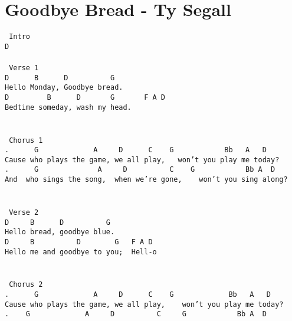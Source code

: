 \newpage
\section{Goodbye Bread - Ty Segall}
\label{Goodbye Bread - Ty Segall}
\texttt{\lbrack\ Intro\rbrack\\
D\\
\\
\lbrack\ Verse\ 1\rbrack\\
D\ \ \ \ \ \ B\ \ \ \ \ \ D\ \ \ \ \ \ \ \ \ \ G\\
Hello\ Monday,\ Goodbye\ bread.\\
D\ \ \ \ \ \ \ \ \ B\ \ \ \ \ \ D\ \ \ \ \ \ \ G\ \ \ \ \ \ \ F\ A\ D\\
Bedtime\ someday,\ wash\ my\ head.\\
\\
\\
\lbrack\ Chorus\ 1\rbrack\\
.\ \ \ \ \ \ G\ \ \ \ \ \ \ \ \ \ \ \ \ A\ \ \ \ \ D\ \ \ \ \ \ C\ \ \ \ G\ \ \ \ \ \ \ \ \ \ \ \ Bb\ \ \ A\ \ \ D\ \\
Cause\ who\ plays\ the\ game,\ we\ all\ play,\ \ \ won't\ you\ play\ me\ today?\\
.\ \ \ \ \ \ G\ \ \ \ \ \ \ \ \ \ \ \ \ \ A\ \ \ \ \ D\ \ \ \ \ \ \ \ \ \ C\ \ \ \ G\ \ \ \ \ \ \ \ \ \ \ \ Bb\ A\ \ D\ \\
And\ \ who\ sings\ the\ song,\ \ when\ we're\ gone,\ \ \ \ won't\ you\ sing\ along?\\
\\
\\
\lbrack\ Verse\ 2\rbrack\\
D\ \ \ \ \ B\ \ \ \ \ \ D\ \ \ \ \ \ \ \ \ \ G\\
Hello\ bread,\ goodbye\ blue.\\
D\ \ \ \ \ B\ \ \ \ \ \ \ \ \ \ D\ \ \ \ \ \ \ \ G\ \ \ F\ A\ D\\
Hello\ me\ and\ goodbye\ to\ you;\ \ Hell-o\\
\\
\\
\lbrack\ Chorus\ 2\rbrack\\
.\ \ \ \ \ \ G\ \ \ \ \ \ \ \ \ \ \ \ \ A\ \ \ \ \ D\ \ \ \ \ \ C\ \ \ \ G\ \ \ \ \ \ \ \ \ \ \ \ \ Bb\ \ \ A\ \ \ D\ \ \ \ \\
Cause\ who\ plays\ the\ game,\ we\ all\ play,\ \ \ \ won't\ you\ play\ me\ today?\\
.\ \ \ \ G\ \ \ \ \ \ \ \ \ \ \ \ \ A\ \ \ \ \ D\ \ \ \ \ \ \ \ \ \ C\ \ \ \ \ G\ \ \ \ \ \ \ \ \ \ \ \ Bb\ A\ \ D\\
}
